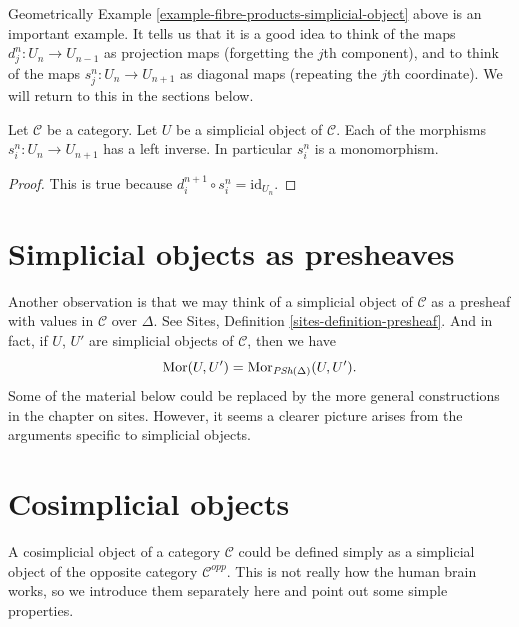 \noindent
Geometrically Example \ref{example-fibre-products-simplicial-object}
above is an important example. It tells us that it is a good
idea to think of the maps $d^n_j : U_n \to U_{n - 1}$
as projection maps (forgetting the $j$th component),
and to think of the maps $s^n_j : U_n \to U_{n + 1}$
as diagonal maps (repeating the $j$th coordinate).
We will return to this in the sections below.

\begin{lemma}
\label{lemma-si-injective}
Let $\mathcal{C}$ be a category.
Let $U$ be a simplicial object of $\mathcal{C}$.
Each of the morphisms $s^n_i : U_n \to U_{n + 1}$
has a left inverse. In particular $s^n_i$ is a monomorphism.
\end{lemma}

\begin{proof}
This is true because $d_i^{n + 1} \circ s^n_i = \text{id}_{U_n}$.
\end{proof}

\section{Simplicial objects as presheaves}
\label{section-simplicial-presheaves}

\noindent
Another observation is that we may think of a simplicial
object of $\mathcal{C}$ as a presheaf with values in $\mathcal{C}$
over $\Delta$. See
Sites, Definition \ref{sites-definition-presheaf}.
And in fact, if $U$, $U'$ are simplicial objects
of $\mathcal{C}$, then we have
\begin{equation}
\label{equation-simplicial-set-presheaf}
\mathop{\mathrm{Mor}}\nolimits(U, U') = \mathop{\mathrm{Mor}}\nolimits_{\textit{PSh}(\Delta)}(U, U').
\end{equation}
Some of the material below could be replaced by the more
general constructions in the chapter on sites.
However, it seems a clearer picture arises from the
arguments specific to simplicial objects.
















\section{Cosimplicial objects}
\label{section-cosimplicial-object}

\noindent
A cosimplicial object of a category $\mathcal{C}$ could
be defined simply as a simplicial object of the
opposite category $\mathcal{C}^{opp}$. This is not
really how the human brain works, so we introduce
them separately here and point out some simple
properties.

